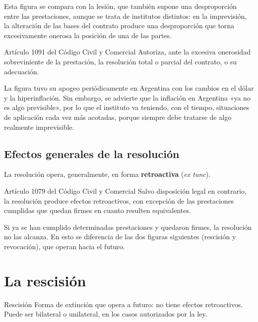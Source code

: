 \documentclass[12pt,oneside]{book}
\begin{document}
Esta figura se compara con la lesión, que también supone una desproporción entre las prestaciones, aunque se trata de institutos distintos: en la imprevisión, la alteración de las bases del contrato produce una desproporción que torna excesivamente onerosa la posición de una de las partes.

\begin{articulo}{Artículo 1091 del Código Civil y Comercial}
Autoriza, ante la excesiva onerosidad sobreviniente de la prestación, la resolución total o parcial del contrato, o su adecuación.
\end{articulo}

\begin{note}
La figura tuvo su apogeo periódicamente en Argentina con los cambios en el dólar y la hiperinflación. Sin embargo, se advierte que la inflación en Argentina «ya no es algo previsible», por lo que el instituto va teniendo, con el tiempo, situaciones de aplicación cada vez más acotadas, porque siempre debe tratarse de algo realmente imprevisible.
\end{note}

\subsection{Efectos generales de la resolución}

La resolución opera, generalmente, en forma \textbf{retroactiva} (\textit{ex tunc}).

\begin{articulo}{Artículo 1079 del Código Civil y Comercial}
Salvo disposición legal en contrario, la resolución produce efectos retroactivos, con excepción de las prestaciones cumplidas que quedan firmes en cuanto resulten equivalentes.
\end{articulo}

Si ya se han cumplido determinadas prestaciones y quedaron firmes, la resolución no las alcanza. En esto se diferencia de las dos figuras siguientes (rescisión y revocación), que operan hacia el futuro.

\section{La rescisión}

\begin{definition}{Rescisión}
Forma de extinción que opera a futuro: no tiene efectos retroactivos. Puede ser bilateral o unilateral, en los casos autorizados por la ley.
\end{definition}
\end{document}
